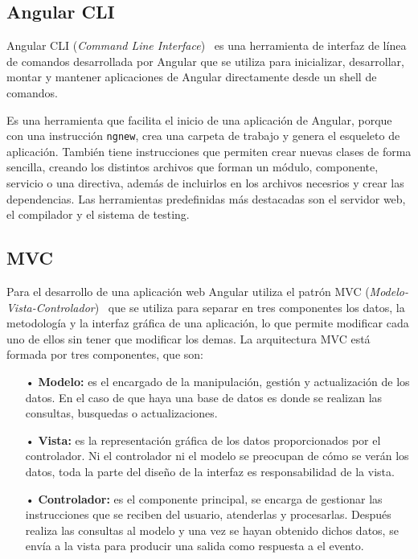 \documentclass[a4paper, 12pt]{book}
\begin{document}
\subsection{Angular CLI}
\label{subsec:Angular CLI}

Angular CLI (\emph{Command Line Interface})~\cite{Pagina_de_angular_CLI} es una herramienta de interfaz de línea de comandos desarrollada por Angular que se utiliza para inicializar, desarrollar, montar y mantener aplicaciones de Angular directamente desde un shell de comandos. 

Es una herramienta que facilita el inicio de una aplicación de Angular, porque con una instrucción \texttt{ngnew}, crea una carpeta de trabajo y genera el esqueleto de aplicación. 
También tiene instrucciones que permiten crear nuevas clases de forma sencilla, creando los distintos archivos que forman un módulo, componente, servicio o una directiva, además de incluirlos en los archivos necesrios y crear las dependencias. 
Las herramientas predefinidas más destacadas son el servidor web, el compilador y el sistema de testing.


\subsection{MVC}
\label{subsec:MVC}

Para el desarrollo de una aplicación web Angular utiliza el patrón MVC (\emph{Modelo-Vista-Controlador})~\cite{Pagina_MVC} que se utiliza para separar en tres componentes los datos, la metodología y la interfaz gráfica de una aplicación, lo que permite modificar cada uno de ellos sin tener que modificar los demas. 
La arquitectura MVC está formada por tres componentes, que son:
	\begin{itemize}
	\item[•] \textbf{Modelo:} es el encargado de la manipulación, gestión y actualización de los datos. 
	En el caso de que haya una base de datos es donde se realizan las consultas, busquedas o actualizaciones.  
	
	\item[•] \textbf{Vista:} es la representación gráfica de los datos proporcionados por el controlador. 
	Ni el controlador ni el modelo se preocupan de cómo se verán los datos, toda la parte del diseño de la interfaz es responsabilidad de la vista.
	
	\item[•] \textbf{Controlador:} es el componente principal, se encarga de gestionar las instrucciones que se reciben del usuario, atenderlas y procesarlas. 
	Después realiza las consultas al modelo y una vez se hayan obtenido dichos datos, se envía a la vista para producir una salida como respuesta a el evento.
	\end{itemize}
	
\end{document}
